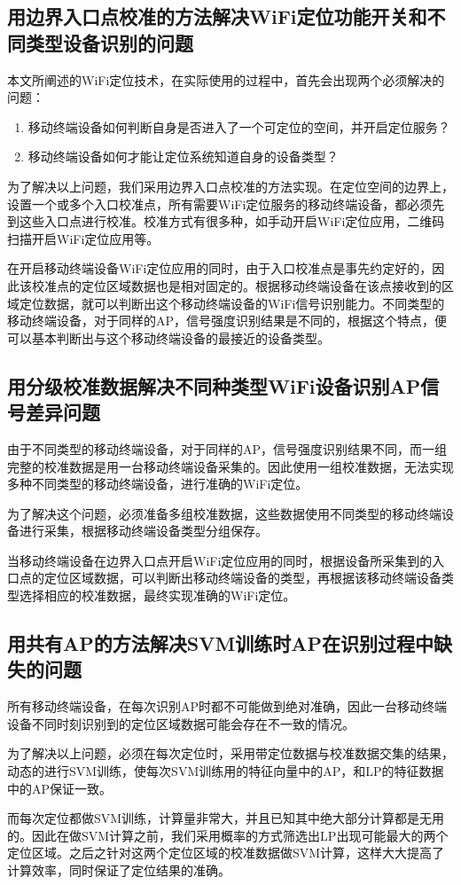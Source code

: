 \documentclass[a4paper, UTF8, twocolumn ]{ctexart}
\begin{document}
\subsection{用边界入口点校准的方法解决WiFi定位功能开关和不同类型设备识别的问题}
本文所阐述的WiFi定位技术，在实际使用的过程中，首先会出现两个必须解决的问题：
\begin{enumerate}
\item 移动终端设备如何判断自身是否进入了一个可定位的空间，并开启定位服务？
\item 移动终端设备如何才能让定位系统知道自身的设备类型？
\end{enumerate}
\par
为了解决以上问题，我们采用边界入口点校准的方法实现。在定位空间的边界上，设置一个或多个入口校准点，所有需要WiFi定位服务的移动终端设备，都必须先到这些入口点进行校准。校准方式有很多种，如手动开启WiFi定位应用，二维码扫描开启WiFi定位应用等。
\par
在开启移动终端设备WiFi定位应用的同时，由于入口校准点是事先约定好的，因此该校准点的定位区域数据也是相对固定的。根据移动终端设备在该点接收到的区域定位数据，就可以判断出这个移动终端设备的WiFi信号识别能力。不同类型的移动终端设备，对于同样的AP，信号强度识别结果是不同的，根据这个特点，便可以基本判断出与这个移动终端设备的最接近的设备类型。

\subsection{用分级校准数据解决不同种类型WiFi设备识别AP信号差异问题}
由于不同类型的移动终端设备，对于同样的AP，信号强度识别结果不同，而一组完整的校准数据是用一台移动终端设备采集的。因此使用一组校准数据，无法实现多种不同类型的移动终端设备，进行准确的WiFi定位。
\par
为了解决这个问题，必须准备多组校准数据，这些数据使用不同类型的移动终端设备进行采集，根据移动终端设备类型分组保存。
\par
当移动终端设备在边界入口点开启WiFi定位应用的同时，根据设备所采集到的入口点的定位区域数据，可以判断出移动终端设备的类型，再根据该移动终端设备类型选择相应的校准数据，最终实现准确的WiFi定位。

\subsection{用共有AP的方法解决SVM训练时AP在识别过程中缺失的问题}
所有移动终端设备，在每次识别AP时都不可能做到绝对准确，因此一台移动终端设备不同时刻识别到的定位区域数据可能会存在不一致的情况。
\par
为了解决以上问题，必须在每次定位时，采用带定位数据与校准数据交集的结果，动态的进行SVM训练，使每次SVM训练用的特征向量中的AP，和LP的特征数据中的AP保证一致。
\par
而每次定位都做SVM训练，计算量非常大，并且已知其中绝大部分计算都是无用的。因此在做SVM计算之前，我们采用概率的方式筛选出LP出现可能最大的两个定位区域。之后之针对这两个定位区域的校准数据做SVM计算，这样大大提高了计算效率，同时保证了定位结果的准确。
\end{document}
